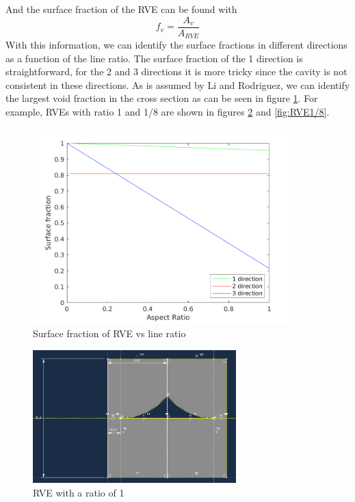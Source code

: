 And the surface fraction of the RVE can be found with
\begin{equation}
f_v = \frac{A_v}{A_{RVE}}
\end{equation}
With this information, we can identify the surface fractions in different directions as a function of the line ratio. The surface fraction of the 1 direction is straightforward, for the 2 and 3 directions it is more tricky since the cavity is not consistent in these directions. As is assumed by Li and Rodriguez, we can identify the largest void fraction in the cross section as can be seen in figure \ref{fig:Surfacefraction}. For example, RVEs with ratio 1 and 1/8 are shown in figures \ref{fig:RVE1} and \ref{fig:RVE1/8}.

\begin{figure}[htb]
    \centering
    \includegraphics[width=0.9\textwidth]{chapter_4_RVE_Definition/figures/Surfacefraction.png}
    \caption{Surface fraction of RVE vs line ratio}
    \label{fig:Surfacefraction}
\end{figure}

\begin{figure}[htb]
    \centering
    \includegraphics[width=0.7\textwidth]{chapter_4_RVE_Definition/figures/RVER1.png}
    \caption{RVE with a ratio of 1}
    \label{fig:RVE1}
\end{figure}

